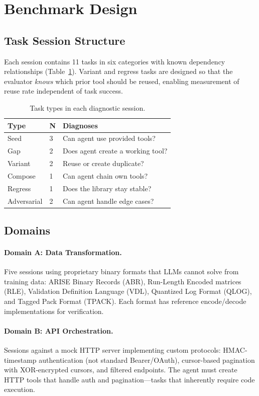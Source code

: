\documentclass[]{ceurart}
\begin{document}
\section{Benchmark Design}

\subsection{Task Session Structure}

Each session contains 11 tasks in six categories with known dependency relationships (Table~\ref{tab:task_types}). Variant and regress tasks are designed so that the evaluator \emph{knows} which prior tool should be reused, enabling measurement of reuse rate independent of task success.

\begin{table}[t]
\centering
\small
\begin{tabular}{llp{4.5cm}}
\toprule
\textbf{Type} & \textbf{N} & \textbf{Diagnoses} \\
\midrule
Seed & 3 & Can agent use provided tools? \\
Gap & 2 & Does agent create a working tool? \\
Variant & 2 & Reuse or create duplicate? \\
Compose & 1 & Can agent chain own tools? \\
Regress & 1 & Does the library stay stable? \\
Adversarial & 2 & Can agent handle edge cases? \\
\bottomrule
\end{tabular}
\caption{Task types in each diagnostic session.}
\label{tab:task_types}
\end{table}

\subsection{Domains}

\paragraph{Domain A: Data Transformation.} Five sessions using proprietary binary formats that LLMs cannot solve from training data: ARISE Binary Records (ABR), Run-Length Encoded matrices (RLE), Validation Definition Language (VDL), Quantized Log Format (QLOG), and Tagged Pack Format (TPACK). Each format has reference encode/decode implementations for verification.

\paragraph{Domain B: API Orchestration.} Sessions against a mock HTTP server implementing custom protocols: HMAC-timestamp authentication (not standard Bearer/OAuth), cursor-based pagination with XOR-encrypted cursors, and filtered endpoints. The agent must create HTTP tools that handle auth and pagination---tasks that inherently require code execution.
\end{document}
